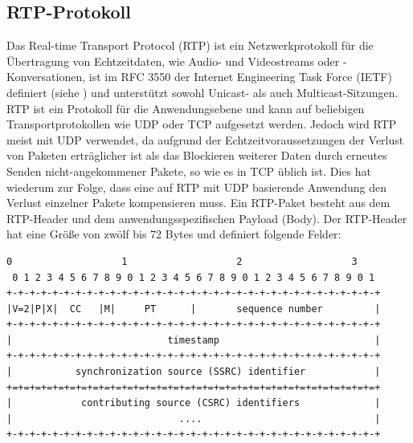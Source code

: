 \subsection{RTP-Protokoll}
\label{rtp}
Das Real-time Transport Protocol (RTP) ist ein Netzwerkprotokoll für die Übertragung von Echtzeitdaten, wie Audio- und Videostreams oder -Konversationen, ist im RFC 3550 der Internet Engineering Task Force (IETF) definiert (siehe \cite{RFC3550}) und unterstützt sowohl Unicast- als auch Multicast-Sitzungen. RTP ist ein Protokoll für die Anwendungsebene und kann auf beliebigen Transportprotokollen wie UDP oder TCP aufgesetzt werden. Jedoch wird RTP meist mit UDP verwendet, da aufgrund der Echtzeitvoraussetzungen der Verlust von Paketen erträglicher ist als das Blockieren weiterer Daten durch erneutes Senden nicht-angekommener Pakete, so wie es in TCP üblich ist. Dies hat wiederum zur Folge, dass eine auf RTP mit UDP basierende Anwendung den Verlust einzelner Pakete kompensieren muss. Ein RTP-Paket besteht aus dem RTP-Header und dem anwendungsspezifischen Payload (Body). Der RTP-Header hat eine Größe von zwölf bis 72 Bytes und definiert folgende Felder:
\begin{lstlisting}[keepspaces=true,numbers=none,label=lst=rtpHeader,caption=RTP Header \cite{RFC3550}]
 0                   1                   2                   3
 0 1 2 3 4 5 6 7 8 9 0 1 2 3 4 5 6 7 8 9 0 1 2 3 4 5 6 7 8 9 0 1
+-+-+-+-+-+-+-+-+-+-+-+-+-+-+-+-+-+-+-+-+-+-+-+-+-+-+-+-+-+-+-+-+
|V=2|P|X|  CC   |M|     PT      |       sequence number         |
+-+-+-+-+-+-+-+-+-+-+-+-+-+-+-+-+-+-+-+-+-+-+-+-+-+-+-+-+-+-+-+-+
|                           timestamp                           |
+-+-+-+-+-+-+-+-+-+-+-+-+-+-+-+-+-+-+-+-+-+-+-+-+-+-+-+-+-+-+-+-+
|           synchronization source (SSRC) identifier            |
+=+=+=+=+=+=+=+=+=+=+=+=+=+=+=+=+=+=+=+=+=+=+=+=+=+=+=+=+=+=+=+=+
|            contributing source (CSRC) identifiers             |
|                             ....                              |
+-+-+-+-+-+-+-+-+-+-+-+-+-+-+-+-+-+-+-+-+-+-+-+-+-+-+-+-+-+-+-+-+
\end{lstlisting}
